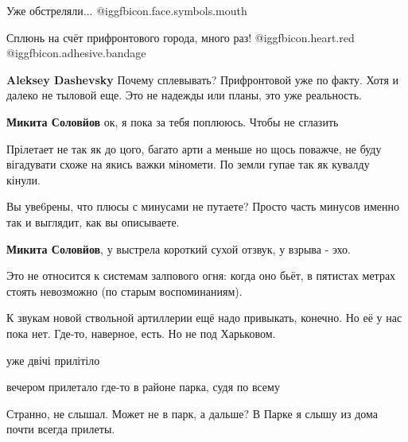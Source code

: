  
 
 
 
 
\zzSecCmt

\begin{itemize} %
Уже обстреляли... @igg{fbicon.face.symbols.mouth} 

Сплюнь на счёт прифронтового города, много раз! @igg{fbicon.heart.red} @igg{fbicon.adhesive.bandage} 

\textbf{Aleksey Dashevsky} Почему сплевывать? Прифронтовой уже по факту. Хотя и далеко не тыловой еще. Это не надежды или планы, это уже реальность.

\textbf{Микита Соловйов} ок, я пока за тебя поплююсь. Чтобы не сглазить


Прілетает не так як до цого, багато арти а меньше но щось поважче, не буду
вігадувати схоже на якись важки міномети. По земли гупае так як кувалду кінули.

\begin{itemize} %
Вы уве6рены, что плюсы с минусами не путаете? Просто часть минусов именно так и выглядит, как вы описываете.

\textbf{Микита Соловйов}, у выстрела короткий сухой отзвук, у взрыва - эхо.

Это не относится к системам залпового огня: когда оно бьёт, в пятистах метрах
стоять невозможно (по старым воспоминаниям).

К звукам новой ствольной артиллерии ещё надо привыкать, конечно. Но её у нас
пока нет. Где-то, наверное, есть. Но не под Харьковом.
\end{itemize} %

уже двічі прилітіло

вечером прилетало где-то в районе парка, судя по всему

\begin{itemize} %
Странно, не слышал. Может не в парк, а дальше? В Парке я слышу из дома почти всегда прилеты.


\end{itemize}
\end{itemize}
